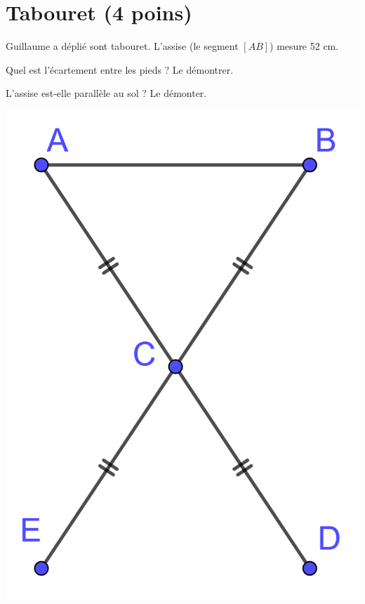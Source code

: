 \section{Tabouret (4 poins)}

\begin{multicols}{2}
	Guillaume a déplié sont tabouret. L'assise (le segment $[AB]$) mesure 52 cm.

\begin{questions}
	\question[2] Quel est l'écartement entre les pieds ? Le démontrer.
	
	\question[2] L'assise est-elle parallèle au sol ? Le démonter.
\end{questions}

\begin{center}
	\includegraphics[scale=0.14]{img/tabouret}
\end{center}
	
	
\end{multicols}